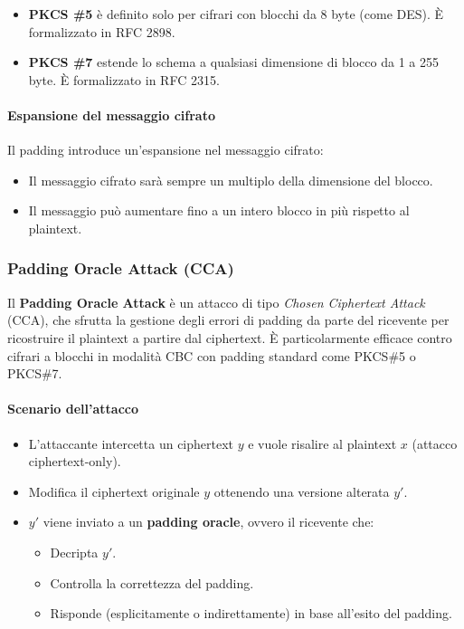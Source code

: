 \documentclass{report}
\begin{document}
\begin{itemize}
    \item \textbf{PKCS \#5} è definito solo per cifrari con blocchi da 8 byte (come DES). È formalizzato in RFC 2898.
    \item \textbf{PKCS \#7} estende lo schema a qualsiasi dimensione di blocco da 1 a 255 byte. È formalizzato in RFC 2315.
\end{itemize}

\paragraph{Espansione del messaggio cifrato}

Il padding introduce un'espansione nel messaggio cifrato:
\begin{itemize}
    \item Il messaggio cifrato sarà sempre un multiplo della dimensione del blocco.
    \item Il messaggio può aumentare fino a un intero blocco in più rispetto al plaintext.
\end{itemize}

\subsubsection{Padding Oracle Attack (CCA)}

Il \textbf{Padding Oracle Attack} è un attacco di tipo \emph{Chosen Ciphertext Attack} (CCA), che sfrutta la gestione degli errori di padding da parte del ricevente per ricostruire il plaintext a partire dal ciphertext. È particolarmente efficace contro cifrari a blocchi in modalità CBC con padding standard come PKCS\#5 o PKCS\#7.

\paragraph{Scenario dell'attacco}
\begin{itemize}
    \item L'attaccante intercetta un ciphertext $y$ e vuole risalire al plaintext $x$ (attacco ciphertext-only).
    \item Modifica il ciphertext originale $y$ ottenendo una versione alterata $y'$.
    \item $y'$ viene inviato a un \textbf{padding oracle}, ovvero il ricevente che:
    \begin{itemize}
        \item Decripta $y'$.
        \item Controlla la correttezza del padding.
        \item Risponde (esplicitamente o indirettamente) in base all’esito del padding.
    \end{itemize}
\end{itemize}
\end{document}
